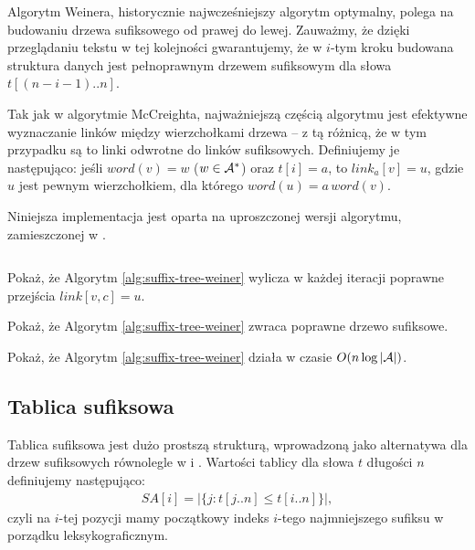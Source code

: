 Algorytm Weinera, historycznie najwcześniejszy algorytm optymalny, polega na budowaniu drzewa sufiksowego od prawej do lewej. Zauważmy, że dzięki przeglądaniu tekstu w tej kolejności gwarantujemy, że w $i$-tym kroku budowana struktura danych jest pełnoprawnym drzewem sufiksowym dla słowa $t[(n - i - 1)..n]$.

Tak jak w algorytmie McCreighta, najważniejszą częścią algorytmu jest efektywne wyznaczanie linków między wierzchołkami drzewa -- z tą różnicą, że w tym przypadku są to linki odwrotne do linków sufiksowych.
Definiujemy je następująco: jeśli $word(v) = w$ ($w \in \mathcal{A}^*$) oraz $t[i] = a$, to $link_a[v] = u$, gdzie $u$ jest pewnym wierzchołkiem, dla którego $word(u) = a \, word(v)$.

Niniejsza implementacja jest oparta na uproszczonej wersji algorytmu, zamieszczonej w \citet{breslauer2013near}.
\begin{code}
\inputminted{python}{code/suffix-tree/weiner.py}
\label{alg:suffix-tree-weiner}
\end{code}

\begin{problem}{}{}
  Pokaż, że Algorytm \ref{alg:suffix-tree-weiner} wylicza w każdej iteracji poprawne przejścia $link[v, c] = u$.
\end{problem}

\begin{problem}{}{}
  Pokaż, że Algorytm \ref{alg:suffix-tree-weiner} zwraca poprawne drzewo sufiksowe.
\end{problem}

\begin{problem}{}{}
  Pokaż, że Algorytm \ref{alg:suffix-tree-weiner} działa w czasie $O(n \log{|\mathcal{A}|})$.
\end{problem}

\subsection{Tablica sufiksowa}

Tablica sufiksowa jest dużo prostszą strukturą, wprowadzoną jako alternatywa dla drzew sufiksowych równolegle w \citep{gonnet1992new} i \citep{manber1993suffix}.
Wartości tablicy dla słowa $t$ długości $n$ definiujemy następująco:
\begin{align*}
    SA[i] = |\{j: t[j..n] \le t[i..n]\}|,
\end{align*}
czyli na $i$-tej pozycji mamy początkowy indeks $i$-tego najmniejszego sufiksu w porządku leksykograficznym.

